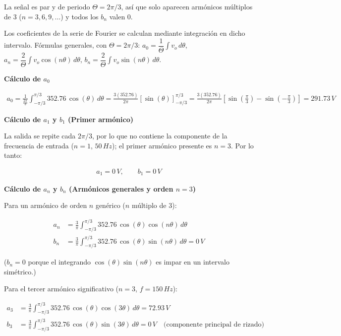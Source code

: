 \documentclass[11pt]{article}
\begin{document}
La se\~nal es par y de periodo $\Theta = 2\pi/3$, as\'i que solo aparecen
arm\'onicos m\'ultiplos de 3 ($n=3,6,9,\dots$) y todos los $b_n$ valen $0$.

Los coeficientes de la serie de Fourier se calculan mediante integraci\'on en
dicho intervalo. F\'ormulas generales, con $\Theta = 2\pi/3$:
$a_0 = \dfrac{1}{\Theta}\displaystyle\int v_o\,d\theta$, \quad
$a_n = \dfrac{2}{\Theta}\displaystyle\int v_o\cos(n\theta)\,d\theta$, \quad
$b_n = \dfrac{2}{\Theta}\displaystyle\int v_o\sin(n\theta)\,d\theta$.

\textbf{C\'alculo de $a_0$}

\begin{align*}
a_0 = \frac{1}{\frac{2\pi}{3}}\int_{-\pi/3}^{\pi/3} 352.76\,\cos(\theta)\,d\theta
= \frac{3(352.76)}{2\pi}\left[\sin(\theta)\right]_{-\pi/3}^{\pi/3}
= \frac{3(352.76)}{2\pi}\left[\sin\!\left(\frac{\pi}{3}\right)-\sin\!\left(-\frac{\pi}{3}\right)\right]
= \boxed{291.73\,V}
\end{align*}

\textbf{C\'alculo de $a_1$ y $b_1$ (Primer arm\'onico)}

La salida se repite cada $2\pi/3$, por lo que no contiene la componente de la
frecuencia de entrada ($n=1$, $50\,Hz$); el primer arm\'onico presente es $n=3$.
Por lo tanto:

\begin{align*}
a_1 = \boxed{0\,V}, \qquad b_1 = \boxed{0\,V}
\end{align*}

\textbf{C\'alculo de $a_n$ y $b_n$ (Arm\'onicos generales y orden $n=3$)}

Para un arm\'onico de orden $n$ gen\'erico ($n$ m\'ultiplo de 3):

\begin{align*}
a_n &= \frac{3}{\pi}\int_{-\pi/3}^{\pi/3} 352.76\,\cos(\theta)\cos(n\theta)\,d\theta \\
b_n &= \frac{3}{\pi}\int_{-\pi/3}^{\pi/3} 352.76\,\cos(\theta)\sin(n\theta)\,d\theta = 0\,V
\end{align*}

($b_n = 0$ porque el integrando $\cos(\theta)\sin(n\theta)$ es impar en un
intervalo sim\'etrico.)

Para el tercer arm\'onico significativo ($n=3$, $f=150\,Hz$):

\begin{align*}
a_3 &= \frac{3}{\pi}\int_{-\pi/3}^{\pi/3} 352.76\,\cos(\theta)\cos(3\theta)\,d\theta = \boxed{72.93\,V} \\
b_3 &= \frac{3}{\pi}\int_{-\pi/3}^{\pi/3} 352.76\,\cos(\theta)\sin(3\theta)\,d\theta = \boxed{0\,V}
\quad \text{(componente principal de rizado)}
\end{align*}
\end{document}
